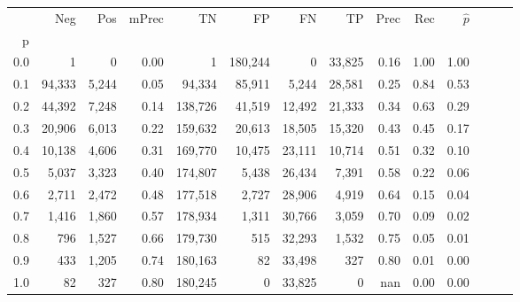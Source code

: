 \begin{tabular}{rrrrrrrrrrrrrr}
\toprule
{} &     Neg &    Pos & mPrec &       TN &       FP &      FN &      TP &  Prec &   Rec & $\hat{p}$ \\
p   &         &        &       &          &          &         &         &       &       &           \\
\midrule
0.0 &       1 &      0 &  0.00 &        1 &  180,244 &       0 &  33,825 &  0.16 &  1.00 &      1.00 \\
0.1 &  94,333 &  5,244 &  0.05 &   94,334 &   85,911 &   5,244 &  28,581 &  0.25 &  0.84 &      0.53 \\
0.2 &  44,392 &  7,248 &  0.14 &  138,726 &   41,519 &  12,492 &  21,333 &  0.34 &  0.63 &      0.29 \\
0.3 &  20,906 &  6,013 &  0.22 &  159,632 &   20,613 &  18,505 &  15,320 &  0.43 &  0.45 &      0.17 \\
0.4 &  10,138 &  4,606 &  0.31 &  169,770 &   10,475 &  23,111 &  10,714 &  0.51 &  0.32 &      0.10 \\
0.5 &   5,037 &  3,323 &  0.40 &  174,807 &    5,438 &  26,434 &   7,391 &  0.58 &  0.22 &      0.06 \\
0.6 &   2,711 &  2,472 &  0.48 &  177,518 &    2,727 &  28,906 &   4,919 &  0.64 &  0.15 &      0.04 \\
0.7 &   1,416 &  1,860 &  0.57 &  178,934 &    1,311 &  30,766 &   3,059 &  0.70 &  0.09 &      0.02 \\
0.8 &     796 &  1,527 &  0.66 &  179,730 &      515 &  32,293 &   1,532 &  0.75 &  0.05 &      0.01 \\
0.9 &     433 &  1,205 &  0.74 &  180,163 &       82 &  33,498 &     327 &  0.80 &  0.01 &      0.00 \\
1.0 &      82 &    327 &  0.80 &  180,245 &        0 &  33,825 &       0 &   nan &  0.00 &      0.00 \\
\bottomrule
\end{tabular}
